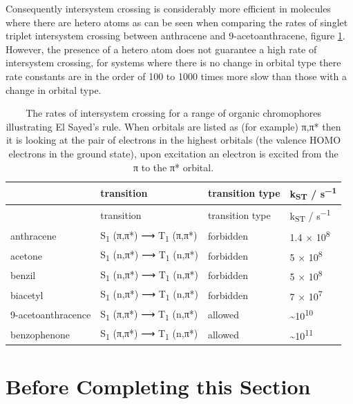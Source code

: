 \documentclass[
]{book}
\begin{document}
Consequently intersystem crossing is considerably more efficient in molecules where there are hetero atoms as can be seen when comparing the rates of singlet triplet intersystem crossing between anthracene and 9-acetoanthracene, figure \ref{tab:rateST}. However, the presence of a hetero atom does not guarantee a high rate of intersystem crossing, for systems where there is no change in orbital type there rate constants are in the order of 100 to 1000 times more slow than those with a change in orbital type.

\begin{longtable}[]{@{}llll@{}}
\caption{\label{tab:rateST} The rates of intersystem crossing for a range of organic chromophores illustrating El Sayed's rule. When orbitals are listed as (for example) π,π* then it is looking at the pair of electrons in the highest orbitals (the valence HOMO electrons in the ground state), upon excitation an electron is excited from the π to the π* orbital.}\tabularnewline
\toprule()
& transition & transition type & k\textsubscript{ST} / s\textsuperscript{−1} \\
\midrule()
\endfirsthead
\toprule()
& transition & transition type & k\textsubscript{ST} / s\textsuperscript{−1} \\
\midrule()
\endhead
anthracene & S\textsubscript{1} (π,π*) ⟶ T\textsubscript{1} (π,π*) & forbidden & 1.4 × 10\textsuperscript{8} \\
acetone & S\textsubscript{1} (n,π*) ⟶ T\textsubscript{1} (n,π*) & forbidden & 5 × 10\textsuperscript{8} \\
benzil & S\textsubscript{1} (n,π*) ⟶ T\textsubscript{1} (n,π*) & forbidden & 5 × 10\textsuperscript{8} \\
biacetyl & S\textsubscript{1} (n,π*) ⟶ T\textsubscript{1} (n,π*) & forbidden & 7 × 10\textsuperscript{7} \\
9-acetoanthracence & S\textsubscript{1} (π,π*) ⟶ T\textsubscript{1} (n,π*) & allowed & \textasciitilde10\textsuperscript{10} \\
benzophenone & S\textsubscript{1} (π,π*) ⟶ T\textsubscript{1} (n,π*) & allowed & \textasciitilde10\textsuperscript{11} \\
\bottomrule()
\end{longtable}

\hypertarget{sec:beforeem}{%
\section{Before Completing this Section}\label{sec:beforeem}}
\end{document}
